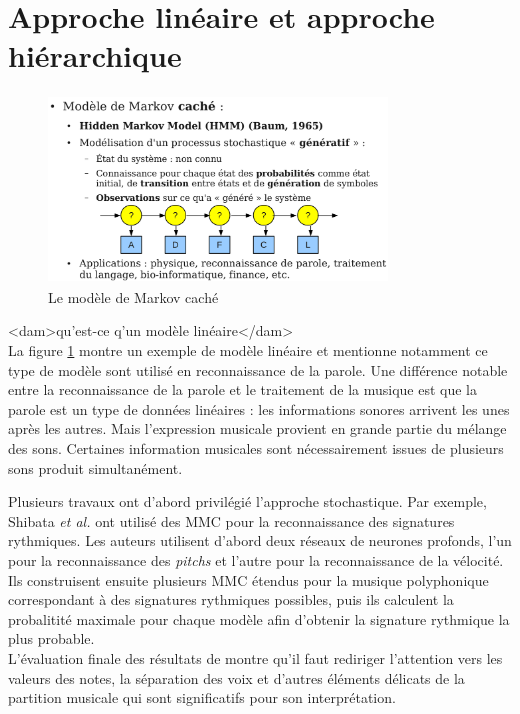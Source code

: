\section{Approche linéaire et approche hiérarchique}

\begin{figure}[h]
	\centering
	\includegraphics[height=50mm, width=90mm]{
    z_images/2_etat_de_l_art/0_hmm.png}
	\caption[Le modèle de Markov caché]{Le modèle de Markov caché\footnotemark}
    \label{mmc}
\end{figure}

<dam>qu'est-ce q'un modèle linéaire</dam>\\
La figure \ref{mmc} montre un exemple de modèle linéaire et mentionne notamment
ce type de modèle sont utilisé en reconnaissance de la parole. Une différence
notable entre la reconnaissance de la parole et le traitement de la musique est
que la parole est un type de données linéaires : les informations sonores
arrivent les unes après les autres. Mais l’expression musicale provient en
grande partie du mélange des sons. Certaines information musicales sont
nécessairement issues de plusieurs sons produit simultanément.

Plusieurs travaux ont d’abord privilégié l’approche stochastique. Par exemple,
Shibata \textit{et al.} \cite{SHIBATA2021262} ont utilisé des MMC pour la
reconnaissance des signatures rythmiques. Les auteurs utilisent d’abord deux
réseaux de neurones profonds, l’un pour la reconnaissance des \textit{pitchs}
et l’autre pour la reconnaissance de la vélocité. Ils construisent ensuite
plusieurs MMC étendus pour la musique polyphonique correspondant à des
signatures rythmiques possibles, puis ils calculent la probalitité maximale
pour chaque modèle afin d’obtenir la signature rythmique la plus probable.\\

L’évaluation finale des résultats de \cite{SHIBATA2021262} montre qu’il faut
rediriger l’attention vers les valeurs des notes, la séparation des voix et
d'autres éléments délicats de la partition musicale qui sont significatifs pour
son interprétation.

